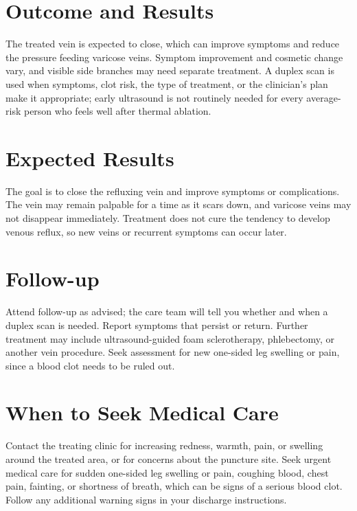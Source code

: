 \section*{Outcome and Results}
The treated vein is expected to close, which can improve symptoms and reduce the pressure feeding varicose veins. Symptom improvement and cosmetic change vary, and visible side branches may need separate treatment. A duplex scan is used when symptoms, clot risk, the type of treatment, or the clinician's plan make it appropriate; early ultrasound is not routinely needed for every average-risk person who feels well after thermal ablation.

\section*{Expected Results}
The goal is to close the refluxing vein and improve symptoms or complications. The vein may remain palpable for a time as it scars down, and varicose veins may not disappear immediately. Treatment does not cure the tendency to develop venous reflux, so new veins or recurrent symptoms can occur later.

\section*{Follow-up}
Attend follow-up as advised; the care team will tell you whether and when a duplex scan is needed. Report symptoms that persist or return. Further treatment may include ultrasound-guided foam sclerotherapy, phlebectomy, or another vein procedure. Seek assessment for new one-sided leg swelling or pain, since a blood clot needs to be ruled out.

\section*{When to Seek Medical Care}
Contact the treating clinic for increasing redness, warmth, pain, or swelling around the treated area, or for concerns about the puncture site. Seek urgent medical care for sudden one-sided leg swelling or pain, coughing blood, chest pain, fainting, or shortness of breath, which can be signs of a serious blood clot. Follow any additional warning signs in your discharge instructions.

